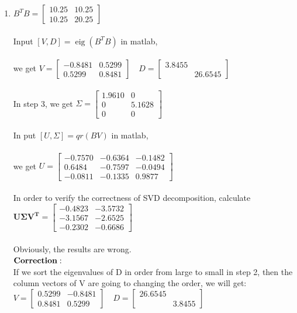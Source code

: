 \documentclass[english,onecolumn]{IEEEtran}
\begin{document}
\begin{enumerate}
	\item
	$B^T B=\left[\begin{array}{ll}10.25 & 10.25 \\ 10.25 & 20.25\end{array}\right]$\\\\
	Input $[V, D]=\operatorname{eig}\left(B^T B\right)$ in matlab,\\\\
	we get $V=\left[\begin{array}{ll}-0.8481 & 0.5299 \\ 0.5299 & 0.8481\end{array}\right] \quad D=\left[\begin{array}{ll}3.8455 &\\ &26.6545\end{array}\right]$\\\\
	In step 3, we get $\Sigma=\left[ \begin{array}{rr}1.9610 & 0 \\ 0 & 5.1628 \\ 0 & 0\end{array}\right]$\\\\
	In put $[U, \Sigma]=q r(B V)$ in matlab,\\\\
	we get $U=\left[\begin{array}{rrr} -0.7570 & -0.6364 & -0.1482 \\ 0.6484 & -0.7597 & -0.0494 \\ -0.0811 & -0.1335 & 0.9877\end{array}\right]$\\\\
	In order to verify the correctness of SVD decomposition, calculate $\mathbf{U\Sigma V^T}=\left[\begin{array}{rr}-0.4823 & -3.5732 \\ -3.1567 & -2.6525 \\ -0.2302 & -0.6686\end{array}\right]$	\\\\
	Obviously, the results are wrong.\\
	$\bold{Correction:}$\\
	If we sort the eigenvalues of D in order from large to small in step 2, then the column vectors of V are going to changing the order, we will get:
	$V=\left[\begin{array}{ll}0.5299 & -0.8481 \\ 0.8481 &0.5299 \end{array}\right] \quad D=\left[\begin{array}{ll} 26.6545&\\ &3.8455\end{array}\right]$\\\\

\end{enumerate}
\end{document}
